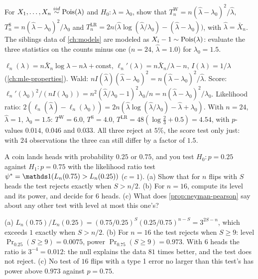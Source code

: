 \begin{exercise}
\label{ex:wlr-poisson}
For $X_1, \ldots, X_n \stackrel{iid}{\sim} \text{Pois}(\lambda)$ and $H_0: \lambda = \lambda_0$, show that $T^{\mathrm{W}}_n = n(\hat{\lambda} - \lambda_0)^2/\hat{\lambda}$, $T^{\mathrm{S}}_n = n(\hat{\lambda} - \lambda_0)^2/\lambda_0$ and $T^{\mathrm{LR}}_n = 2n\big(\hat{\lambda}\log(\hat{\lambda}/\lambda_0) - (\hat{\lambda} - \lambda_0)\big)$, with $\hat{\lambda} = \bar{X}_n$. The siblings data of \cref{ch:models} are modeled as $X_i - 1 \sim \text{Pois}(\lambda)$: evaluate the three statistics on the counts minus one ($n = 24$, $\hat{\lambda} = 1.0$) for $\lambda_0 = 1.5$.
\end{exercise}
\begin{solution}
$\ell_n(\lambda) = n\bar{X}_n\log\lambda - n\lambda + \text{const}$, $\ell_n'(\lambda) = n\bar{X}_n/\lambda - n$, $I(\lambda) = 1/\lambda$ (\cref{ch:mle-properties}). Wald: $nI(\hat{\lambda})(\hat{\lambda} - \lambda_0)^2 = n(\hat{\lambda} - \lambda_0)^2/\hat{\lambda}$. Score: $\ell_n'(\lambda_0)^2/(nI(\lambda_0)) = n^2(\hat{\lambda}/\lambda_0 - 1)^2\lambda_0/n = n(\hat{\lambda} - \lambda_0)^2/\lambda_0$. Likelihood ratio: $2(\ell_n(\hat{\lambda}) - \ell_n(\lambda_0)) = 2n(\hat{\lambda}\log(\hat{\lambda}/\lambda_0) - \hat{\lambda} + \lambda_0)$. With $n = 24$, $\hat{\lambda} = 1$, $\lambda_0 = 1.5$: $T^{\mathrm{W}} = 6.0$, $T^{\mathrm{S}} = 4.0$, $T^{\mathrm{LR}} = 48(\log\frac23 + 0.5) = 4.54$, with $p$-values $0.014$, $0.046$ and $0.033$. All three reject at $5\%$, the score test only just: with $24$ observations the three can still differ by a factor of $1.5$.
\end{solution}

\begin{exercise}
\label{ex:wlr-np-coin}
A coin lands heads with probability $0.25$ or $0.75$, and you test $H_0: p = 0.25$ against $H_1: p = 0.75$ with the likelihood ratio test $\psi^* = \ind(L_n(0.75) > L_n(0.25))$ ($c = 1$). (a) Show that for $n$ flips with $S$ heads the test rejects exactly when $S > n/2$. (b) For $n = 16$, compute its level and its power, and decide for $6$ heads. (c) What does \cref{prop:neyman-pearson} say about any other test with level at most this one's?
\end{exercise}
\begin{solution}
(a) $L_n(0.75)/L_n(0.25) = (0.75/0.25)^S(0.25/0.75)^{n - S} = 3^{2S - n}$, which exceeds $1$ exactly when $S > n/2$. (b) For $n = 16$ the test rejects when $S \geq 9$: level $\Pr_{0.25}(S \geq 9) = 0.0075$, power $\Pr_{0.75}(S \geq 9) = 0.973$. With $6$ heads the ratio is $3^{-4} = 0.012$: the null explains the data $81$ times better, and the test does not reject. (c) No test of $16$ flips with a type 1 error no larger than this test's has power above $0.973$ against $p = 0.75$.
\end{solution}

